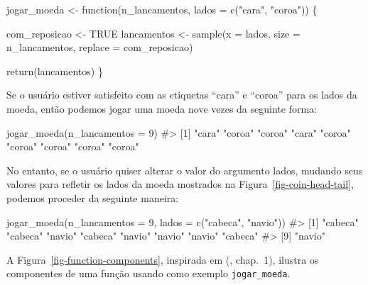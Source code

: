 \documentclass[
  letterpaper,
]{book}
\newenvironment{Shaded}{\begin{snugshade}}{\end{snugshade}}
\newcommand{\AttributeTok}[1]{\textcolor[rgb]{0.40,0.45,0.13}{#1}}
\newcommand{\CommentTok}[1]{\textcolor[rgb]{0.37,0.37,0.37}{#1}}
\newcommand{\ConstantTok}[1]{\textcolor[rgb]{0.56,0.35,0.01}{#1}}
\newcommand{\ControlFlowTok}[1]{\textcolor[rgb]{0.00,0.23,0.31}{#1}}
\newcommand{\DecValTok}[1]{\textcolor[rgb]{0.68,0.00,0.00}{#1}}
\newcommand{\FunctionTok}[1]{\textcolor[rgb]{0.28,0.35,0.67}{#1}}
\newcommand{\NormalTok}[1]{\textcolor[rgb]{0.00,0.23,0.31}{#1}}
\newcommand{\OtherTok}[1]{\textcolor[rgb]{0.00,0.23,0.31}{#1}}
\newcommand{\StringTok}[1]{\textcolor[rgb]{0.13,0.47,0.30}{#1}}
\theoremstyle{definition}
\theoremstyle{plain}
\theoremstyle{remark}
\begin{document}
\begin{Shaded}
\begin{Highlighting}[]
\NormalTok{jogar\_moeda }\OtherTok{\textless{}{-}} \ControlFlowTok{function}\NormalTok{(n\_lancamentos, }
                        \AttributeTok{lados =} \FunctionTok{c}\NormalTok{(}\StringTok{"cara"}\NormalTok{, }\StringTok{"coroa"}\NormalTok{)) \{}
  
\NormalTok{  com\_reposicao }\OtherTok{\textless{}{-}} \ConstantTok{TRUE}
\NormalTok{  lancamentos }\OtherTok{\textless{}{-}} \FunctionTok{sample}\NormalTok{(}\AttributeTok{x =}\NormalTok{ lados, }
                        \AttributeTok{size =}\NormalTok{ n\_lancamentos, }
                        \AttributeTok{replace =}\NormalTok{ com\_reposicao)}
  
  \FunctionTok{return}\NormalTok{(lancamentos)}
\NormalTok{\}}
\end{Highlighting}
\end{Shaded}

Se o usuário estiver satisfeito com as etiquetas ``cara'' e ``coroa''
para os lados da moeda, então podemos jogar uma moeda nove vezes da
seguinte forma:

\begin{Shaded}
\begin{Highlighting}[]
\FunctionTok{jogar\_moeda}\NormalTok{(}\AttributeTok{n\_lancamentos =} \DecValTok{9}\NormalTok{)}
\CommentTok{\#\textgreater{} [1] "cara"  "coroa" "coroa" "cara"  "coroa" "coroa" "coroa" "coroa" "coroa"}
\end{Highlighting}
\end{Shaded}

No entanto, se o usuário quiser alterar o valor do argumento lados,
mudando seus valores para refletir os lados da moeda mostrados na
Figura~\ref{fig-coin-head-tail}, podemos proceder da seguinte maneira:

\begin{Shaded}
\begin{Highlighting}[]
\FunctionTok{jogar\_moeda}\NormalTok{(}\AttributeTok{n\_lancamentos =} \DecValTok{9}\NormalTok{, }\AttributeTok{lados =} \FunctionTok{c}\NormalTok{(}\StringTok{"cabeca"}\NormalTok{, }\StringTok{"navio"}\NormalTok{))}
\CommentTok{\#\textgreater{} [1] "cabeca" "cabeca" "navio"  "cabeca" "navio"  "navio"  "navio"  "cabeca"}
\CommentTok{\#\textgreater{} [9] "navio"}
\end{Highlighting}
\end{Shaded}

A Figura~\ref{fig-function-components}, inspirada em
(, chap.~1), ilustra os componentes de uma função usando como
exemplo \texttt{jogar\_moeda}.
\end{document}
